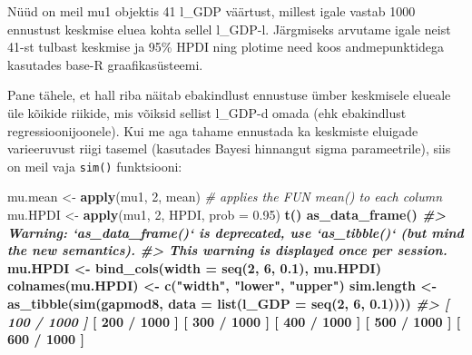 \documentclass[]{book}
\newenvironment{Shaded}{\begin{snugshade}}{\end{snugshade}}
\newcommand{\KeywordTok}[1]{\textcolor[rgb]{0.13,0.29,0.53}{\textbf{#1}}}
\newcommand{\DataTypeTok}[1]{\textcolor[rgb]{0.13,0.29,0.53}{#1}}
\newcommand{\DecValTok}[1]{\textcolor[rgb]{0.00,0.00,0.81}{#1}}
\newcommand{\FloatTok}[1]{\textcolor[rgb]{0.00,0.00,0.81}{#1}}
\newcommand{\StringTok}[1]{\textcolor[rgb]{0.31,0.60,0.02}{#1}}
\newcommand{\CommentTok}[1]{\textcolor[rgb]{0.56,0.35,0.01}{\textit{#1}}}
\newcommand{\OperatorTok}[1]{\textcolor[rgb]{0.81,0.36,0.00}{\textbf{#1}}}
\newcommand{\NormalTok}[1]{#1}
\begin{document}
Nüüd on meil mu1 objektis 41 l\_GDP väärtust, millest igale vastab 1000
ennustust keskmise eluea kohta sellel l\_GDP-l. Järgmiseks arvutame
igale neist 41-st tulbast keskmise ja 95\% HPDI ning plotime need koos
andmepunktidega kasutades base-R graafikasüsteemi.

Pane tähele, et hall riba näitab ebakindlust ennustuse ümber keskmisele
elueale üle kõikide riikide, mis võiksid sellist l\_GDP-d omada (ehk
ebakindlust regressioonijoonele). Kui me aga tahame ennustada ka
keskmiste eluigade varieeruvust riigi tasemel (kasutades Bayesi
hinnangut sigma parameetrile), siis on meil vaja \texttt{sim()}
funktsiooni:

\begin{Shaded}
\begin{Highlighting}[]
\NormalTok{mu.mean <-}\StringTok{ }\KeywordTok{apply}\NormalTok{(mu1, }\DecValTok{2}\NormalTok{, mean) }\CommentTok{# applies the FUN mean() to each column}
\NormalTok{mu.HPDI <-}\StringTok{ }\KeywordTok{apply}\NormalTok{(mu1, }\DecValTok{2}\NormalTok{, HPDI, }\DataTypeTok{prob =} \FloatTok{0.95}\NormalTok{) }\OperatorTok{%
\StringTok{  }\KeywordTok{t}\NormalTok{() }\OperatorTok{%
\StringTok{  }\KeywordTok{as_data_frame}\NormalTok{()}
\CommentTok{#> Warning: `as_data_frame()` is deprecated, use `as_tibble()` (but mind the new semantics).}
\CommentTok{#> This warning is displayed once per session.}
\NormalTok{mu.HPDI <-}\StringTok{ }\KeywordTok{bind_cols}\NormalTok{(}\DataTypeTok{width =} \KeywordTok{seq}\NormalTok{(}\DecValTok{2}\NormalTok{, }\DecValTok{6}\NormalTok{, }\FloatTok{0.1}\NormalTok{), mu.HPDI)}
\KeywordTok{colnames}\NormalTok{(mu.HPDI) <-}\StringTok{ }\KeywordTok{c}\NormalTok{(}\StringTok{"width"}\NormalTok{, }\StringTok{"lower"}\NormalTok{, }\StringTok{"upper"}\NormalTok{)}
\NormalTok{sim.length <-}\StringTok{ }\KeywordTok{as_tibble}\NormalTok{(}\KeywordTok{sim}\NormalTok{(gapmod8, }\DataTypeTok{data =} \KeywordTok{list}\NormalTok{(}\DataTypeTok{l_GDP =} \KeywordTok{seq}\NormalTok{(}\DecValTok{2}\NormalTok{, }\DecValTok{6}\NormalTok{, }\FloatTok{0.1}\NormalTok{))))}
\CommentTok{#> [ 100 / 1000 ]}
\NormalTok{[ }\DecValTok{200} \OperatorTok{/}\StringTok{ }\DecValTok{1000}\NormalTok{ ]}
\NormalTok{[ }\DecValTok{300} \OperatorTok{/}\StringTok{ }\DecValTok{1000}\NormalTok{ ]}
\NormalTok{[ }\DecValTok{400} \OperatorTok{/}\StringTok{ }\DecValTok{1000}\NormalTok{ ]}
\NormalTok{[ }\DecValTok{500} \OperatorTok{/}\StringTok{ }\DecValTok{1000}\NormalTok{ ]}
\NormalTok{[ }\DecValTok{600} \OperatorTok{/}\StringTok{ }\DecValTok{1000}\NormalTok{ ]}
}}
\end{Highlighting}
\end{Shaded}
\end{document}
